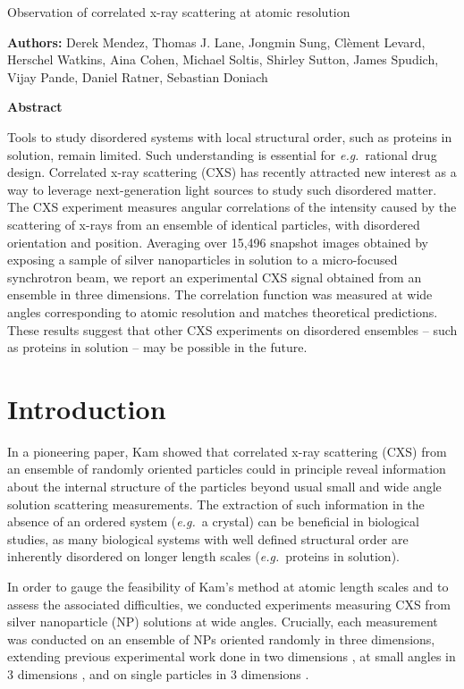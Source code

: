 \documentclass [11pt,fleqn]{article}
\def \hfb {\hfill\break}
\begin{document}
 
\hspace{1cm}{\bf Title:} Observation of correlated x-ray scattering at atomic resolution \hfb
 
{\bf Authors:} Derek Mendez, Thomas J. Lane, Jongmin Sung,  Cl\`ement Levard, Herschel Watkins, Aina Cohen, Michael Soltis, Shirley Sutton, James Spudich, Vijay Pande,  Daniel Ratner, Sebastian Doniach

{\bf Abstract}

Tools to study disordered systems with local structural order, such as proteins in solution, remain limited. Such understanding is essential for \emph{e.g.}~rational drug design. Correlated x-ray scattering (CXS) has recently attracted new interest as a way to leverage next-generation light sources to study such disordered matter. The CXS experiment measures angular correlations of the intensity caused by the scattering of x-rays from an ensemble of identical particles, with disordered orientation and position. Averaging over 15,496 snapshot images obtained by exposing a sample of silver nanoparticles in solution to a micro-focused synchrotron beam, we report an experimental CXS signal obtained from an ensemble in three dimensions. The correlation function was measured at  wide angles corresponding to atomic resolution and matches theoretical predictions. These results suggest that other CXS experiments on disordered ensembles -- such as proteins in solution -- may be possible in the future.


\section{Introduction}

In a pioneering paper, Kam \cite{Kam:1977wc} showed that correlated x-ray scattering (CXS) from an ensemble of randomly oriented particles could in principle reveal information about the internal structure of the particles beyond usual small and wide angle solution scattering measurements. The extraction of such information in the absence of an ordered system (\textit{e.g.}~a crystal) can be beneficial in biological studies, as many biological systems with well defined structural order are inherently disordered on longer length scales (\textit{e.g.}~proteins in solution).

In order to gauge the feasibility of Kam's method at atomic length scales and to assess the associated difficulties, we conducted experiments measuring CXS from silver nanoparticle (NP) solutions at wide angles. Crucially, each measurement was conducted on an ensemble of NPs oriented randomly in three dimensions, extending previous experimental work done in two dimensions \cite{Saldin:2011ch}, at small angles in 3 dimensions \cite{Kam:1981ua, Wochner:2009ia}, and on single particles in 3 dimensions \cite{Kam:1985tz, Starodub:1fy}. 
\end{document}
